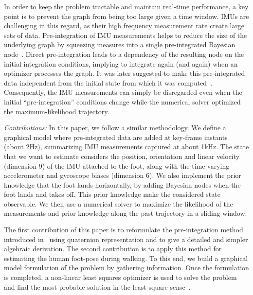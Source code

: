 
In order to keep the problem tractable and maintain real-time performance, a key point is to prevent the graph from being too large given a time window.
IMUs are challenging in this regard, as their high frequency measurement rate create large sets of data. 
Pre-integration of IMU measurements helps to reduce the size of the underlying graph by squeezing measures into a single pre-integrated Bayesian node~\cite{LUPTON-09}.
Direct pre-integration leads to a dependency of the resulting node on the initial integration conditions, implying to integrate again (and again) when an optimizer processes the graph.
It was later suggested to make this pre-integrated data independent from the initial state from which it was computed~\cite{forster2015imu}.
Consequently, the IMU measurements can simply be disregarded even when the initial ``pre-integration'' conditions change while the numerical solver optimized the maximum-likelihood trajectory.

\textit{Contributions: }
In this paper, we follow a similar methodology. We define a graphical model where pre-integrated data are added at key-frame instants (about 2Hz), summarizing IMU measurements captured at about 1kHz.
The state that we want to estimate considers the position, orientation and linear velocity (dimension 9) of the IMU attached to the foot, along with the time-varying accelerometer and gyroscope biases (dimension 6).
We also implement the prior knowledge that the foot lands horizontally, by adding Bayesian nodes when the foot lands and takes off.
This prior knowledge make the considered state observable. 
We then use a numerical solver to maximize the likelihood of the measurements and prior knowledge along the past trajectory in a sliding window. 

The first contribution of this paper is to reformulate the pre-integration method introduced in~\cite{forster2015imu} using quaternion representation
and to give a detailed and simpler algebraic derivation.
The second contribution is to apply this method for estimating the human foot-pose during walking.
To this end, we build a graphical model formulation of the problem by gathering information.
Once the formulation is completed, a non-linear least squares optimizer is used to solve the problem and find the most probable solution in the least-square sense~\cite{ceres-solver}.

